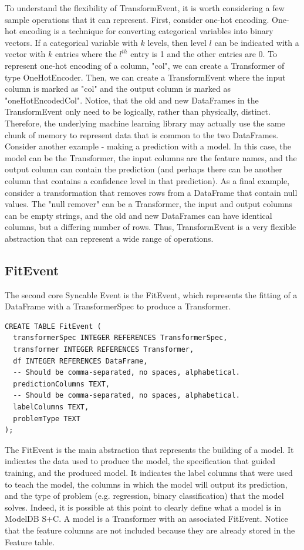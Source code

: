 To understand the flexibility of TransformEvent, it is worth considering a few
sample operations that it can represent. First, consider one-hot encoding. One-hot
encoding is a technique for converting categorical variables into binary vectors.
If a categorical variable with $k$ levels, then level $l$ can be indicated with
a vector with $k$ entries where the $l^{th}$ entry is 1 and the other entries are
0. To represent one-hot encoding of a column, "col", we can create a Transformer of
type OneHotEncoder. Then, we can create a TransformEvent where the input column
is marked as "col" and the output column is marked as "oneHotEncodedCol". Notice,
that the old and new DataFrames in the TransformEvent only need to be logically, rather
than physically, distinct. Therefore, the underlying machine learning library may
actually use the same chunk of memory to represent data that is common to the two 
DataFrames. Consider another example - making a prediction with a model. In this
case, the model can be the Transformer, the input columns are the feature names,
and the output column can contain the prediction (and perhaps there can be another
column that contains a confidence level in that prediction). As a final example,
consider a transformation that removes rows from a DataFrame that contain null values.
The "null remover" can be a Transformer, the input and output columns can be empty
strings, and the old and new DataFrames can have identical columns, but a differing
number of rows. Thus, TransformEvent is a very flexible abstraction that can represent
a wide range of operations.

\subsection{FitEvent}

The second core Syncable Event is the FitEvent, which represents the fitting of a
DataFrame with a TransformerSpec to produce a Transformer.

\begin{verbatim}
CREATE TABLE FitEvent (
  transformerSpec INTEGER REFERENCES TransformerSpec,
  transformer INTEGER REFERENCES Transformer,
  df INTEGER REFERENCES DataFrame,
  -- Should be comma-separated, no spaces, alphabetical.
  predictionColumns TEXT, 
  -- Should be comma-separated, no spaces, alphabetical.
  labelColumns TEXT, 
  problemType TEXT 
);
\end{verbatim}

The FitEvent is the main abstraction that represents the building of a model. It
indicates the data used to produce the model, the specification that guided training,
and the produced model. It indicates the label columns that were used to teach the
model, the columns in which the model will output its prediction, and the type of
problem (e.g. regression, binary classification) that the model solves. Indeed, it
is possible at this point to clearly define what a model is in ModelDB S+C. A model is
a Transformer with an associated FitEvent. 
Notice that the feature columns are not included because they are already stored in the Feature
table. 

